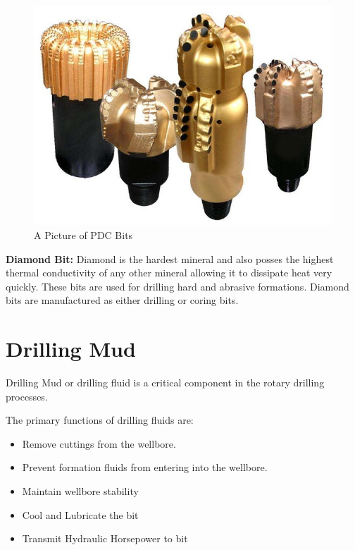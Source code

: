 \begin{figure}[h]
\includegraphics[scale=0.3]{images/PDCbits}
\centering 
\caption{A Picture of PDC Bits}
\end{figure}

\textbf{Diamond Bit:} Diamond is the hardest mineral and also posses the highest thermal conductivity 
of any other mineral allowing it to dissipate heat very quickly. 
These bits are used for drilling hard and
abrasive formations. Diamond bits are manufactured as either drilling or coring bits.



\section*{Drilling Mud}
	
Drilling Mud or drilling fluid is a critical component in the rotary drilling processes.

The primary functions of drilling fluids are:

\begin{itemize}

\item Remove cuttings from the wellbore.
\item Prevent formation fluids from entering into the wellbore.
\item Maintain wellbore stability
\item Cool and Lubricate the bit
\item Transmit Hydraulic Horsepower to bit

\end{itemize}


